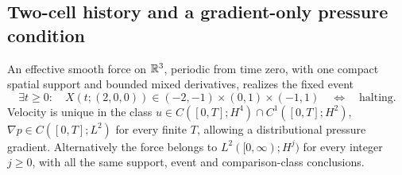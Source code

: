 \subsection{Two-cell history and a gradient-only pressure condition}
\label{sec:bb-guarded-history}

\begin{theorem}\label{thm:bb-guarded-history}
An effective smooth force on $\mathbb R^3$, periodic from time zero,
with one compact spatial support and bounded mixed derivatives,
realizes the fixed event
\[
 \exists t\ge0:\quad X(t;(2,0,0))\in(-2,-1)\times(0,1)\times(-1,1)
 \quad\Longleftrightarrow\quad\text{halting}.
\]
Velocity is unique in the class
$u\in C([0,T];H^4)\cap C^1([0,T];H^2)$,
$\nabla p\in C([0,T];L^2)$ for every finite $T$, allowing a
distributional pressure gradient.  Alternatively the force belongs
to $L^2([0,\infty);H^j)$ for every integer $j\ge0$, with all the
same support, event and comparison-class conclusions.
\end{theorem}
